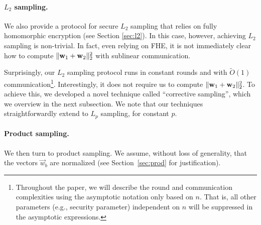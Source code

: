 %
%

\paragraph{$L_2$ sampling.} We also provide a protocol for secure $L_2$
sampling that relies on fully homomorphic encryption (see Section
\ref{sec:l2}). In this case, however, achieving $L_2$ sampling is
non-trivial.  In fact, even relying on FHE, it is not immediately clear how to compute $\|\mathbf{w}_1 +
\mathbf{w}_2\|^2_2$ with sublinear communication. 

Surprisingly, our $L_2$ sampling protocol runs in constant
rounds and with $\tilde O(1)$  communication\footnote{Throughout the paper, we will describe the round and communication complexities using the asymptotic notation only based on $n$. That is, all other parameters (e.g., security parameter) independent on $n$ will be suppressed in the asymptotic expressions.}. Interestingly, it does not require us to compute  $\|\mathbf{w}_1 +
\mathbf{w}_2\|^2_2$. To achieve this, we developed a
novel technique called ``corrective sampling'', which we overview in the
next subsection. 
We note that our techniques straightforwardly
extend to $L_p$ sampling, for constant $p$.


\paragraph{Product sampling.} We then turn to product sampling.
%
%
%
We assume, without loss of generality, that the vectors $\vec{w}_b$ are normalized (see
Section~\ref{sec:prod} for justification). 

